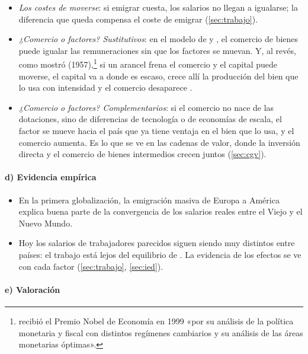 \documentclass[11pt]{article}
\begin{document}
\begin{itemize}
\item \emph{Los costes de moverse}: si emigrar cuesta, los salarios no llegan a igualarse; la diferencia que queda compensa el coste de emigrar (\ref{sec:trabajo}).
\item \emph{¿Comercio o factores? Sustitutivos}: en el modelo de  y , el comercio de bienes puede igualar las remuneraciones sin que los factores se muevan. Y, al revés, como mostró  (1957),\footnote{ recibió el Premio Nobel de Economía en 1999 «por su análisis de la política monetaria y fiscal con distintos regímenes cambiarios y su análisis de las áreas monetarias óptimas»\nocite{Nobel1999Mundell}.} si un arancel frena el comercio y el capital puede moverse, el capital va a donde es escaso, crece allí la producción del bien que lo usa con intensidad y el comercio desaparece\nocite{Mundell1957} .
\item \emph{¿Comercio o factores? Complementarios}: si el comercio no nace de las dotaciones, sino de diferencias de tecnología o de economías de escala, el factor se mueve hacia el país que ya tiene ventaja en el bien que lo usa, y el comercio aumenta\nocite{Markusen1983Factor}. Es lo que se ve en las cadenas de valor, donde la inversión directa y el comercio de bienes intermedios crecen juntos (\ref{sec:cgv}).
\end{itemize}

\paragraph{d) Evidencia empírica}

\begin{itemize}
\item En la primera globalización, la emigración masiva de Europa a América explica buena parte de la convergencia de los salarios reales entre el Viejo y el Nuevo Mundo\nocite{ORourkeWilliamson1999Globalization}.
\item Hoy los salarios de trabajadores parecidos siguen siendo muy distintos entre países: el trabajo está lejos del equilibrio de . La evidencia de los efectos se ve con cada factor (\ref{sec:trabajo}, \ref{sec:ied}).
\end{itemize}

\paragraph{e) Valoración}
\end{document}
